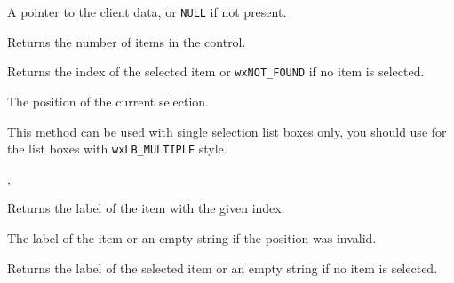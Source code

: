 A pointer to the client data, or {\tt NULL} if not present.


\label{wxcontrolwithitemsgetcount}


Returns the number of items in the control.




\label{wxcontrolwithitemsgetselection}


Returns the index of the selected item or {\tt wxNOT\_FOUND} if no item is
selected.


The position of the current selection.


This method can be used with single selection list boxes only, you should use 
 for the list boxes
with {\tt wxLB\_MULTIPLE} style.


,\rtfsp
{}


\label{wxcontrolwithitemsgetstring}


Returns the label of the item with the given index.




The label of the item or an empty string if the position was invalid.


\label{wxcontrolwithitemsgetstringselection}


Returns the label of the selected item or an empty string if no item is
selected.




